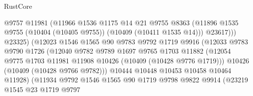 \begin{lexlean}{RustCore}
\begin{coremodule}
                                  @9757
                                  @11981
                                  (@11966
                                    @1536
                                    @1175
                                    @14
                                    @21
                                    @9755
                                    @8363
                                    (@11896
                                      @1535
                                      @9755
                                      (@10404 (@10405 @9755))
                                      (@10409 (@10411 @1535 @14)))
                                    @23617)))
                              @23325)
                            (@12023
                              @1546
                              @1565
                              @90
                              @9783
                              @9792
                              @1719
                              @9916
                              (@12033
                                @9783
                                @9790
                                @1726
                                (@12040
                                  @9782
                                  @9789
                                  @1697
                                  @9765
                                  @1703
                                  @11882
                                  (@12054
                                    @9775
                                    @1703
                                    @11981
                                    @11908
                                    @10426
                                    (@10409 (@10428 @9776 @1719)))
                                  @10426
                                  (@10409 (@10428 @9766 @9782)))
                                @10444
                                @10448
                                @10453
                                @10458
                                @10464
                                @11928)
                              (@11934
                                @9792
                                @1546
                                @1565
                                @90
                                @1719
                                @9798
                                @9822
                                @9914
                                (@23219
                                  @1545
                                  @23
                                  @1719
                                  @9797

\end{coremodule}
\end{lexlean}
